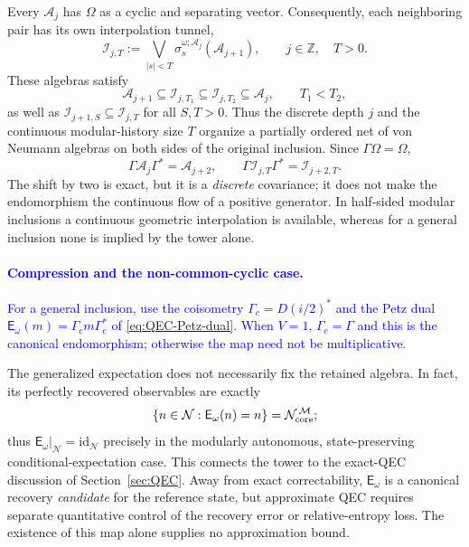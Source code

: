 \documentclass[a4paper,11pt]{article}
\theoremstyle{definition}
\newcommand{\mA}{\mathcal{A}}
\newcommand{\mN}{\mathcal{N}}
\newcommand{\mI}{\mathcal{I}}
\newcommand{\mM}{\mathcal{M}}
\newcommand{\NL}[1]{\textcolor{blue}{#1}}
\begin{document}
Every $\mA_j$ has $\Omega$ as a cyclic and separating vector.
Consequently, each neighboring pair has its own interpolation tunnel,
\begin{equation}
 \boxed{\quad
 \mI_{j,T}:=
 \bigvee_{|s|<T}
 \sigma_s^{\omega;\mA_j}(\mA_{j+1}),
 \qquad j\in\mathbb Z,\quad T>0.
 \quad}
 \label{eq:interpolation-tower-net}
\end{equation}
These algebras satisfy
\begin{equation}
 \mA_{j+1}\subseteq\mI_{j,T_1}
 \subseteq\mI_{j,T_2}\subseteq\mA_j,
 \qquad T_1<T_2,
 \label{eq:interpolation-tower-net-order}
\end{equation}
as well as $\mI_{j+1,S}\subseteq\mI_{j,T}$ for all $S,T>0$.
Thus the discrete depth $j$ and the continuous modular-history size $T$
organize a partially ordered net of von Neumann algebras on both
sides of the original inclusion. Since $\Gamma\Omega=\Omega$,
\begin{equation}
 \boxed{\quad
 \Gamma\mA_j\Gamma^*=\mA_{j+2},\qquad
 \Gamma\mI_{j,T}\Gamma^*=\mI_{j+2,T}.
 \quad}
 \label{eq:interpolation-shift-covariance}
\end{equation}
The shift by two is exact, but it is a \emph{discrete} covariance;
it does not make the endomorphism the continuous flow of a positive
generator. In half-sided modular inclusions a continuous geometric
interpolation is available, whereas for a general inclusion none is
implied by the tower alone.

\paragraph{\NL{Compression and the non-common-cyclic case.}}

\NL{For a general inclusion, use the coisometry $\Gamma_c=D(i/2)^*$ and the Petz dual $\mathsf E_\omega(m)=\Gamma_c m\Gamma_c^*$ of \eqref{eq:QEC-Petz-dual}. When $V=1$, $\Gamma_c=\Gamma$ and this is the canonical endomorphism; otherwise the map need not be multiplicative.}


The generalized expectation does not necessarily fix the retained
algebra. In fact, its perfectly recovered observables are exactly
\begin{equation}
 \{n\in\mN:\mathsf E_\omega(n)=n\}
 =\mN_{\rm core}^{\,\mM};
 \label{eq:interpolation-Petz-fixed-core}
\end{equation}
thus $\mathsf E_\omega|_{\mN}=\mathrm{id}_{\mN}$ precisely in the
modularly autonomous, state-preserving conditional-expectation case.
This connects the tower to the exact-QEC discussion of
Section~\ref{sec:QEC}. Away from exact correctability,
$\mathsf E_\omega$ is a canonical recovery \emph{candidate} for the
reference state, but approximate QEC requires separate quantitative
control of the recovery error or relative-entropy loss. The existence
of this map alone supplies no approximation bound.
\end{document}
